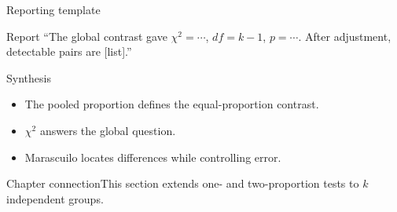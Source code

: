 \documentclass[10pt,aspectratio=169]{beamer}
\begin{document}
\begin{frame}{Reporting template}\small\begin{block}{Report} ``The global contrast gave $\chi^2=\cdots$, $df=k-1$, $p=\cdots$. After adjustment, detectable pairs are [list].''\end{block}\end{frame}
\begin{frame}{Synthesis}\small\begin{itemize}\item The pooled proportion defines the equal-proportion contrast.\item $\chi^2$ answers the global question.\item Marascuilo locates differences while controlling error.\end{itemize}\end{frame}
\begin{frame}{Chapter connection}\small This section extends one- and two-proportion tests to $k$ independent groups.\end{frame}
\end{document}

